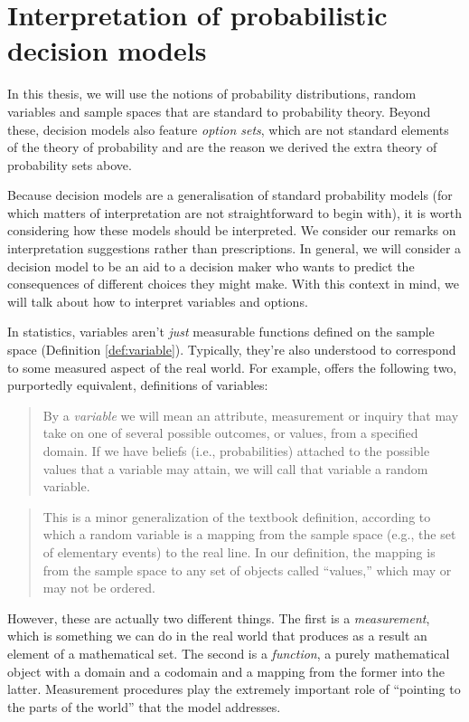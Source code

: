 \section{Interpretation of probabilistic decision models}\label{sec:interp_of_dms}

In this thesis, we will use the notions of probability distributions, random variables and sample spaces that are standard to probability theory. Beyond these, decision models also feature \emph{option sets}, which are not standard elements of the theory of probability and are the reason we derived the extra theory of probability sets above. 

Because decision models are a generalisation of standard probability models (for which matters of interpretation are not straightforward to begin with), it is worth considering how these models should be interpreted. We consider our remarks on interpretation suggestions rather than prescriptions. In general, we will consider a decision model to be an aid to a decision maker who wants to predict the consequences of different choices they might make. With this context in mind, we will talk about how to interpret variables and options.

In statistics, variables aren't \emph{just} measurable functions defined on the sample space (Definition \ref{def:variable}). Typically, they're also understood to correspond to some measured aspect of the real world. For example, \citet{pearl_causality:_2009} offers the following two, purportedly equivalent, definitions of variables:
\begin{quote}
By a \emph{variable} we will mean an attribute, measurement or inquiry that may take on one of several possible outcomes, or values, from a specified domain. If we have beliefs (i.e., probabilities) attached to the possible values that a variable may attain, we will call that variable a random variable.
\end{quote}

\begin{quote}
This is a minor generalization of the textbook definition, according to which a random variable is a mapping from the sample space (e.g., the set of elementary events) to the real line. In our definition, the mapping is from the sample space to any set of objects called ``values,'' which may or may not be ordered.
\end{quote}

However, these are actually two different things. The first is a \emph{measurement}, which is something we can do in the real world that produces as a result an element of a mathematical set. The second is a \emph{function}, a purely mathematical object with a domain and a codomain and a mapping from the former into the latter. Measurement procedures play the extremely important role of ``pointing to the parts of the world'' that the model addresses.

